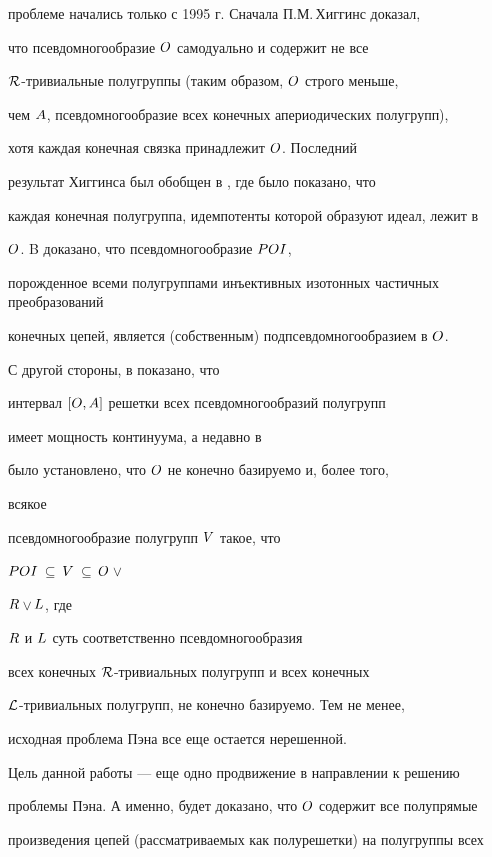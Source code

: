 проблеме начались только с 1995 г. Сначала П.М.\,Хиггинс \cite{HIG1} доказал,


что псевдомногообразие $\boldmath{O}$ самодуально и содержит не все


${\cal R}$-тривиальные полугруппы (таким образом, $\boldmath{O}$ строго меньше,


чем $\boldmath{A}$, псевдомногообразие всех конечных апериодических полугрупп),


хотя каждая конечная связка принадлежит $\boldmath{O}$. Последний 


результат Хиггинса был обобщен в \cite{V-V}, где было показано, что


каждая конечная полугруппа, идемпотенты которой образуют идеал, лежит в


$\boldmath{O}$. B \cite{VHF1} доказано, что псевдомногообразие $\boldmath POI$,


порожденное всеми полугруппами инъективных изотонных частичных преобразований


конечных цепей, является (собственным) подпсевдомногообразием в $\boldmath{O}$.


С другой стороны, в \cite{A-V} показано, что


интервал $[\boldmath{O}, \boldmath{A}]$ решетки всех псевдомногообразий полугрупп


имеет мощность континуума, а недавно в \cite{RV}


было установлено, что $\boldmath{O}$ не конечно базируемо и, более того,


всякое


псевдомногообразие полугрупп $\boldmath{V}$ такое, что


$\boldmath POI$\,$\subseteq$\,$\boldmath{V}$\,$\subseteq$\,$\boldmath{O}$\,$\vee$\,%


$\boldmath{R}$\,$\vee$\,$\boldmath{L}$, где


$\boldmath{R}$ и $\boldmath{L}$ суть соответственно псевдомногообразия


всех конечных $\cal R$-тривиальных полугрупп и всех конечных


$\cal L$-тривиальных полугрупп, не конечно базируемо. Тем не менее,


исходная проблема Пэна все еще остается нерешенной.





Цель данной работы --- еще одно продвижение в направлении к решению


проблемы Пэна. А именно, будет доказано, что $\boldmath{O}$ содержит все полупрямые


произведения цепей (рассматриваемых как полурешетки) на полугруппы всех


